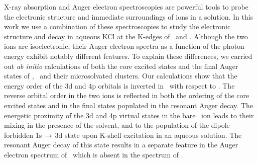 X-ray absorption and Auger electron spectroscopies are powerful tools to probe the electronic structure and immediate surroundings of ions in a solution. In this work we use a combination of these spectroscopies to study the electronic structure and decay in aqueous KCl at the K-edges of \ki~and \cli. Although the two ions are isoelectronic, their Auger electron spectra as a function of the photon energy exhibit notably different features. To explain these differences, we carried out {\it ab initio} calculations of both the core excited states and the final Auger states of \ki, \cli~and their microsolvated clusters. Our calculations show that the energy order of the 3d and 4p orbitals is inverted in \ki~with respect to \cli. The reverse orbital order in the two ions is reflected in both the ordering of the core excited states and in the final states populated in the resonant Auger decay. The energetic proximity of the 3d and 4p virtual states in the bare \ki~ion leads to their mixing in the presence of the solvent, and to the population of the dipole forbidden 1s$\,\rightarrow\,$3d state upon K-shell excitation in an aqueous solution. The resonant Auger decay of this state results in a separate feature in the Auger electron spectrum of \ki~which is absent in the spectrum of \cli.